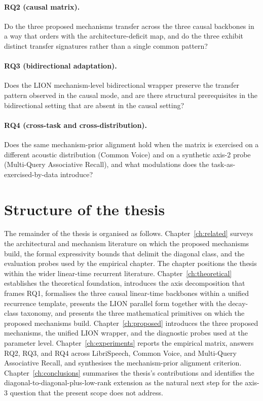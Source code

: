 \paragraph{RQ2 (causal matrix).} Do the three proposed mechanisms
transfer across the three causal backbones in a way that orders
with the architecture-deficit map, and do the three exhibit
distinct transfer signatures rather than a single common
pattern?

\paragraph{RQ3 (bidirectional adaptation).} Does the LION
mechanism-level bidirectional wrapper preserve the transfer
pattern observed in the causal mode, and are there structural
prerequisites in the bidirectional setting that are absent in
the causal setting?

\paragraph{RQ4 (cross-task and cross-distribution).} Does the
same mechanism-prior alignment hold when the matrix is exercised
on a different acoustic distribution (Common Voice) and on a
synthetic axis-2 probe (Multi-Query Associative Recall), and
what modulations does the task-as-exercised-by-data introduce?

\section{Structure of the thesis}\label{sec:intro:structure}

The remainder of the thesis is organised as follows.
Chapter~\ref{ch:related} surveys the architectural and
mechanism literature on which the proposed mechanisms build, the
formal expressivity bounds that delimit the diagonal class, and
the evaluation probes used by the empirical chapter. The chapter
positions the thesis within the wider linear-time recurrent
literature.
Chapter~\ref{ch:theoretical} establishes the theoretical
foundation, introduces the axis decomposition that frames RQ1,
formalises the three causal linear-time backbones within a
unified recurrence template, presents the LION parallel form
together with the decay-class taxonomy, and presents the three
mathematical primitives on which the proposed mechanisms build.
Chapter~\ref{ch:proposed} introduces the three proposed
mechanisms, the unified LION wrapper, and the diagnostic probes
used at the parameter level.
Chapter~\ref{ch:experiments} reports the empirical matrix,
answers RQ2, RQ3, and RQ4 across LibriSpeech, Common Voice, and
Multi-Query Associative Recall, and synthesises the
mechanism-prior alignment criterion.
Chapter~\ref{ch:conclusions} summarises the thesis's
contributions and identifies the diagonal-to-diagonal-plus-low-rank
extension as the natural next step for the axis-3 question that
the present scope does not address.

